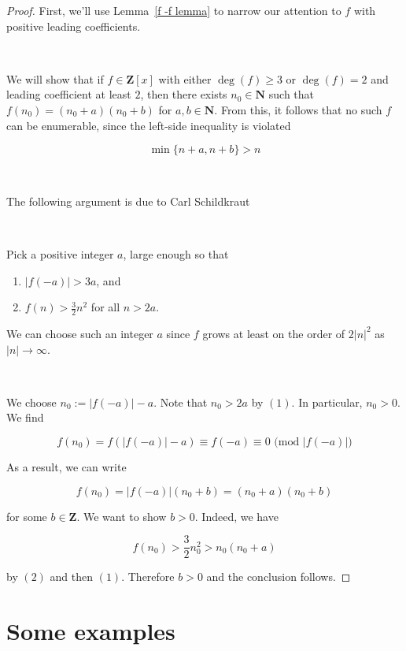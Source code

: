 \documentclass{article}
\begin{document}
\begin{proof}
First, we'll use Lemma~\ref{f -f lemma} to narrow our attention to $f$ with positive leading coefficients.

\

We will show that if $f \in \mathbf{Z}[x]$ with either $\deg(f) \geq 3$ or $\deg(f) = 2$ and leading coefficient at least $2$, then there exists $n_0 \in \mathbf{N}$ such that $f(n_0) = (n_0+a)(n_0+b)$ for $a, b \in \mathbf{N}$. From this, it follows that no such $f$ can be enumerable, since the left-side inequality is violated

$$\min \{n+a, n+b \} > n$$

\

The following argument is due to Carl Schildkraut \cite{carlslemma}

\

Pick a positive integer $a$, large enough so that

\begin{enumerate}
    \item $|f(-a)| > 3a$, and
    \item $f(n) > \frac{3}{2}n^2$ for all $n > 2a$.
\end{enumerate}

We can choose such an integer $a$ since $f$ grows at least on the order of $2|n|^2$ as $|n| \rightarrow \infty$.

\

We choose $n_0 := |f(-a)| - a$. Note that $n_0 > 2a$ by $(1)$. In particular, $n_0 > 0$. We find

$$f(n_0) = f(|f(-a)|-a) \equiv f(-a) \equiv 0 \text{ (mod } |f(-a)|)$$

As a result, we can write

$$f(n_0) = |f(-a)|(n_0+b) = (n_0+a)(n_0+b)$$

for some $b \in \mathbf{Z}$. We want to show $b > 0$. Indeed, we have

$$f(n_0) > \frac{3}{2}n_0^2 > n_0(n_0 + a)$$

by $(2)$ and then $(1)$. Therefore $b > 0$ and the conclusion follows.
\end{proof}

\section{Some examples}\label{section_examples}
\end{document}
